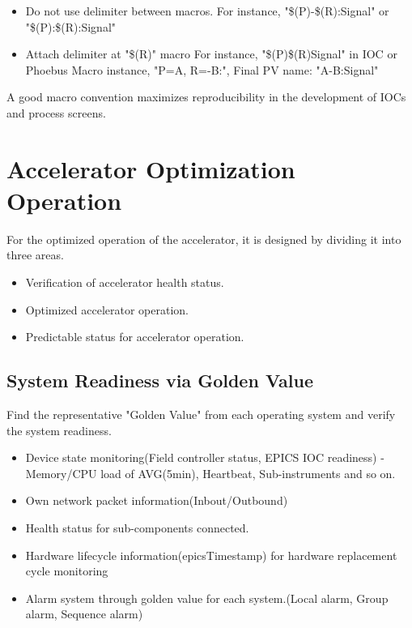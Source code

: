 \documentclass[11pt
  , letterpaper
  , article
  , oneside
  , showtrims
]{memoir}
\begin{document}
\begin{itemize}
	\item Do not use delimiter between macros. 
	\newline
	For instance, "\$(P)-\$(R):Signal" or "\$(P):\$(R):Signal"
	\item Attach delimiter at "\$(R)" macro
	\newline
	For instance, "\$(P)\$(R)Signal" in IOC or Phoebus
	\newline
	Macro instance, "P=A, R=-B:", Final PV name: "A-B:Signal"
\end{itemize}

A good macro convention maximizes reproducibility in the development of IOCs and process screens.

\chapter{Accelerator Optimization Operation}
For the optimized operation of the accelerator, it is designed by dividing it into three areas.

\begin{itemize}
	\item Verification of accelerator health status.
	\item Optimized accelerator operation.
	\item Predictable status for accelerator operation.
\end{itemize}

\section{System Readiness via Golden Value}
Find the representative "Golden Value" from each operating system and verify the system readiness.

\begin{itemize}
	\item Device state monitoring(Field controller status, EPICS IOC readiness)
	\newline
	- Memory/CPU load of AVG(5min), Heartbeat, Sub-instruments and so on.
	\item Own network packet information(Inbout/Outbound)
	\item Health status for sub-components connected.
	\item Hardware lifecycle information(epicsTimestamp) for hardware replacement cycle monitoring
	\item Alarm system through golden value for each system.(Local alarm, Group alarm, Sequence alarm)
\end{itemize}
\end{document}
